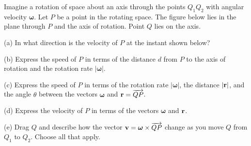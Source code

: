 \documentclass{ximera}
\begin{document}
\begin{question}  \label{Qdstjigvgf:Cross}
Imagine a rotation of space about an axis through the points $Q_1Q_2$ with angular velocity $\boldsymbol{\omega}$. Let $P$ be a point in the rotating space. The figure below lies in the plane through $P$ and the axis of rotation. Point $Q$ lies on the axis.

(a) In what direction is the velocity of $P$ at the instant shown below?

(b) Express the speed of $P$ in terms of the distance $d$ from $P$ to the axis of rotation and the rotation rate $|\boldsymbol{\omega}|$.

(c) Express the speed of $P$ in terms of the rotation rate $|\boldsymbol{\omega}|$, the distance $|{\bf r}|$, and the angle $\theta$ between the vectors $\boldsymbol{\omega}$ and ${\bf r} = \overrightarrow{QP}$.

(d) Express the velocity of $P$ in terms of the vectors $\boldsymbol{\omega}$ and ${\bf r}$.


(e) Drag $Q$ and describe how the vector ${\bf v} = \boldsymbol{\omega}\times {\overrightarrow{QP}}$ change as you move $Q$ from $Q_1$ to $Q_2$. Choose all that apply.

\begin{selectAll}   
\end{selectAll}    





 
\begin{onlineOnly}
    \begin{center}
\end{center}
\end{onlineOnly}

\end{question}
\end{document}
